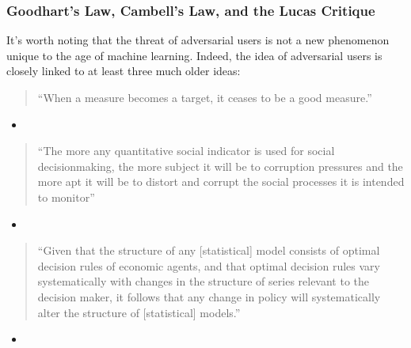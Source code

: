 \documentclass[letterpaper,10pt,english]{jupyterBook}
\begin{document}
\subsubsection{Goodhart’s Law, Cambell’s Law, and the Lucas Critique}
\label{\detokenize{30_questions/24_passive_prediction_external:goodhart-s-law-cambell-s-law-and-the-lucas-critique}}
\sphinxAtStartPar
It’s worth noting that the threat of adversarial users is not a new phenomenon unique to the age of machine learning. Indeed, the idea of adversarial users is closely linked to at least three much older ideas:
\begin{quote}

\sphinxAtStartPar
“When a measure becomes a target, it ceases to be a good measure.”
\end{quote}
\begin{itemize}
\item {} 
\sphinxAtStartPar
{}

\end{itemize}
\begin{quote}

\sphinxAtStartPar
“The more any quantitative social indicator is used for social decision\sphinxhyphen{}making, the more subject it will be to corruption pressures and the more apt it will be to distort and corrupt the social processes it is intended to monitor”
\end{quote}
\begin{itemize}
\item {} 
\sphinxAtStartPar
{}

\end{itemize}
\begin{quote}

\sphinxAtStartPar
“Given that the structure of any {[}statistical{]} model consists of optimal decision rules of economic agents, and that optimal decision rules vary systematically with changes in the structure of series relevant to the decision maker, it follows that any change in policy will systematically alter the structure of {[}statistical{]} models.”
\end{quote}
\begin{itemize}
\item {} 
\sphinxAtStartPar
{}

\end{itemize}
\end{document}
